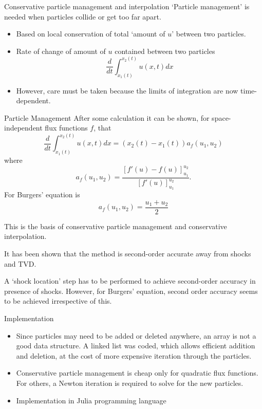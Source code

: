 \documentclass{beamer}
\begin{document}
\begin{frame}{Conservative particle management and interpolation}
`Particle management' is needed when particles collide or get too far apart.
\begin{itemize}
	\item Based on local conservation of total `amount of $u$' between two particles.
	\item Rate of change of amount of $u$ contained between two particles
	\begin{equation}
		\frac{d}{dt}\int_{x_1(t)}^{x_2(t)}u(x,t)dx
	\end{equation}
	\item However, care must be taken because the limits of integration are now time-dependent.
\end{itemize}
\end{frame}

\begin{frame}{Particle Management}
After some calculation it can be shown, for space-independent flux functions $f$, that
\begin{equation}
\frac{d}{dt}\int_{x_1(t)}^{x_2(t)}u(x,t)dx = (x_2(t)-x_1(t))a_f(u_1,u_2)
\end{equation}
where
\begin{equation}
a_f(u_1,u_2) = \frac{[f'(u)-f(u)]_{u_1}^{u_2}}{[f'(u)]_{u_1}^{u_2}}.
\end{equation}
For Burgers' equation is
\begin{equation}
a_f(u_1,u_2) = \frac{u_1+u_2}{2}
\end{equation}

This is the basis of conservative particle management and conservative interpolation.
\end{frame}

\begin{frame}
It has been shown that the method is second-order accurate away from shocks and TVD.

A `shock location' step has to be performed to achieve second-order accuracy in presence of shocks. However, for Burgers' equation, second order accuracy seems to be achieved irrespective of this.
\end{frame}

\begin{frame}{Implementation}
\begin{itemize}
	\item Since particles may need to be added or deleted anywhere, an array is not a good data structure. A linked list was coded, which allows efficient addition and deletion, at the cost of more expensive iteration through the particles.
	\item Conservative particle management is cheap only for quadratic flux functions. For others, a Newton iteration is required to solve for the new particles.
	\item Implementation in Julia programming language \cite{julia}
\end{itemize}
\end{frame}
\end{document}
